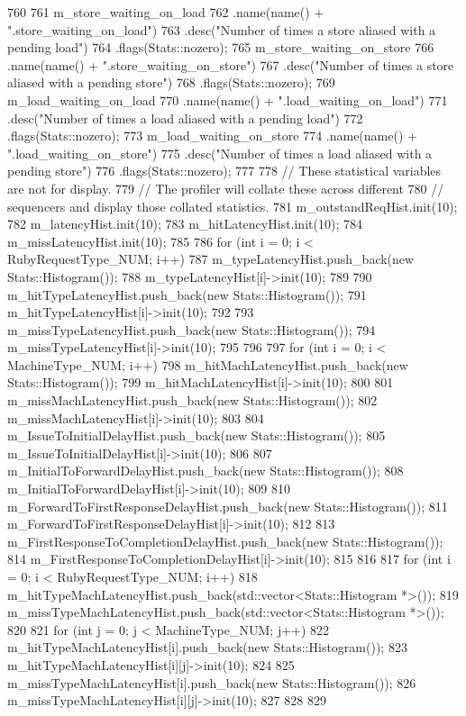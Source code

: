\begin{DoxyCode}
760 {
761     m_store_waiting_on_load
762         .name(name() + ".store_waiting_on_load")
763         .desc("Number of times a store aliased with a pending load")
764         .flags(Stats::nozero);
765     m_store_waiting_on_store
766         .name(name() + ".store_waiting_on_store")
767         .desc("Number of times a store aliased with a pending store")
768         .flags(Stats::nozero);
769     m_load_waiting_on_load
770         .name(name() + ".load_waiting_on_load")
771         .desc("Number of times a load aliased with a pending load")
772         .flags(Stats::nozero);
773     m_load_waiting_on_store
774         .name(name() + ".load_waiting_on_store")
775         .desc("Number of times a load aliased with a pending store")
776         .flags(Stats::nozero);
777 
778     // These statistical variables are not for display.
779     // The profiler will collate these across different
780     // sequencers and display those collated statistics.
781     m_outstandReqHist.init(10);
782     m_latencyHist.init(10);
783     m_hitLatencyHist.init(10);
784     m_missLatencyHist.init(10);
785 
786     for (int i = 0; i < RubyRequestType_NUM; i++) {
787         m_typeLatencyHist.push_back(new Stats::Histogram());
788         m_typeLatencyHist[i]->init(10);
789 
790         m_hitTypeLatencyHist.push_back(new Stats::Histogram());
791         m_hitTypeLatencyHist[i]->init(10);
792 
793         m_missTypeLatencyHist.push_back(new Stats::Histogram());
794         m_missTypeLatencyHist[i]->init(10);
795     }
796 
797     for (int i = 0; i < MachineType_NUM; i++) {
798         m_hitMachLatencyHist.push_back(new Stats::Histogram());
799         m_hitMachLatencyHist[i]->init(10);
800 
801         m_missMachLatencyHist.push_back(new Stats::Histogram());
802         m_missMachLatencyHist[i]->init(10);
803 
804         m_IssueToInitialDelayHist.push_back(new Stats::Histogram());
805         m_IssueToInitialDelayHist[i]->init(10);
806 
807         m_InitialToForwardDelayHist.push_back(new Stats::Histogram());
808         m_InitialToForwardDelayHist[i]->init(10);
809 
810         m_ForwardToFirstResponseDelayHist.push_back(new Stats::Histogram());
811         m_ForwardToFirstResponseDelayHist[i]->init(10);
812 
813         m_FirstResponseToCompletionDelayHist.push_back(new Stats::Histogram());
814         m_FirstResponseToCompletionDelayHist[i]->init(10);
815     }
816 
817     for (int i = 0; i < RubyRequestType_NUM; i++) {
818         m_hitTypeMachLatencyHist.push_back(std::vector<Stats::Histogram *>());
819         m_missTypeMachLatencyHist.push_back(std::vector<Stats::Histogram *>());
820 
821         for (int j = 0; j < MachineType_NUM; j++) {
822             m_hitTypeMachLatencyHist[i].push_back(new Stats::Histogram());
823             m_hitTypeMachLatencyHist[i][j]->init(10);
824 
825             m_missTypeMachLatencyHist[i].push_back(new Stats::Histogram());
826             m_missTypeMachLatencyHist[i][j]->init(10);
827         }
828     }
829 }
\end{DoxyCode}
